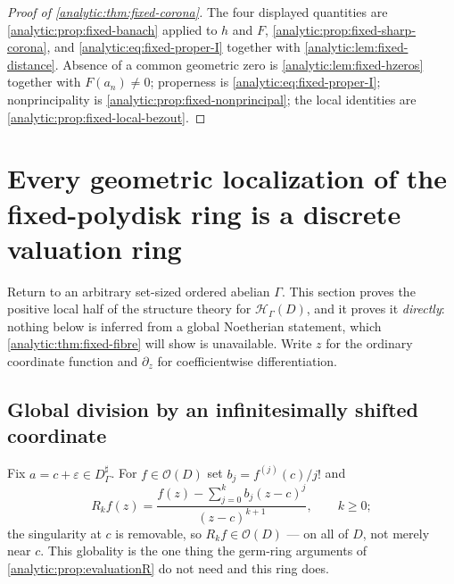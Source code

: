 \documentclass[11pt,letterpaper]{article}
\theoremstyle{definition}
\theoremstyle{remark}
\newcommand{\HH}{\mathcal H}
\newcommand{\OO}{\mathcal O}
\numberwithin{equation}{section}
\begin{document}
\begin{proof}[Proof of \cref{analytic:thm:fixed-corona}]
The four displayed quantities are \cref{analytic:prop:fixed-banach}
applied to $h$ and $F$, \cref{analytic:prop:fixed-sharp-corona}, and
\eqref{analytic:eq:fixed-proper-I} together with
\cref{analytic:lem:fixed-distance}. Absence of a common geometric zero is
\cref{analytic:lem:fixed-hzeros} together with $F(a_n)\ne0$; properness is
\eqref{analytic:eq:fixed-proper-I}; nonprincipality is
\cref{analytic:prop:fixed-nonprincipal}; the local identities are
\cref{analytic:prop:fixed-local-bezout}.
\end{proof}
\section{Every geometric localization of the fixed-polydisk ring is a
discrete valuation ring}\label{analytic:sec:fixed-local}

Return to an arbitrary set-sized ordered abelian $\Gamma$. This section
proves the positive local half of the structure theory for
$\HH_\Gamma(D)$, and it proves it \emph{directly}: nothing below is
inferred from a global Noetherian statement, which
\cref{analytic:thm:fixed-fibre} will show is unavailable. Write $z$ for the
ordinary coordinate function and $\partial_z$ for coefficientwise
differentiation.

\subsection{Global division by an infinitesimally shifted coordinate}
Fix $a=c+\varepsilon\in D^\sharp_\Gamma$. For $f\in\OO(D)$ set
$b_j=f^{(j)}(c)/j!$ and
\begin{equation}\label{analytic:eq:fixed-remainders}
 R_kf(z)=\frac{f(z)-\sum_{j=0}^kb_j(z-c)^j}{(z-c)^{k+1}},\qquad k\ge0 ;
\end{equation}
the singularity at $c$ is removable, so $R_kf\in\OO(D)$ --- on all of $D$,
not merely near $c$. This globality is the one thing the germ-ring
arguments of \cref{analytic:prop:evaluationR} do not need and this ring
does.
\end{document}
